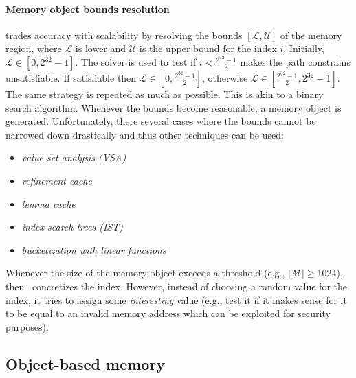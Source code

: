 \paragraph{Memory object bounds resolution} \cite{MAYHEM-SP12} trades accuracy with scalability by resolving the bounds $[\mathcal{L}, \mathcal{U}]$ of the memory region, where $\mathcal{L}$ is lower and $\mathcal{U}$ is the upper bound for the index $i$. Initially, $\mathcal{L} \in [0, 2^{32}-1]$. The solver is used to test if $i < \frac{2^{32}-1}{2}$ makes the path constrains unsatisfiable. If satisfiable then $\mathcal{L} \in [0, \frac{2^{32}-1}{2}]$, otherwise $\mathcal{L} \in [\frac{2^{32}-1}{2}, 2^{32}-1]$. The same strategy is repeated as much as possible. This is akin to a binary search algorithm. Whenever the bounds become reasonable, a memory object is generated. Unfortunately, there several cases where the bounds cannot be narrowed down drastically and thus other techniques can be used:
\begin{itemize}
  \item {\em value set analysis (VSA)}
  \item {\em refinement cache}
  \item {\em lemma cache}
  \item {\em index search trees (IST)}
  \item {\em bucketization with linear functions}
\end{itemize}
Whenever the size of the memory object exceeds a threshold (e.g., $|\mathcal{M}| \geq 1024$), then~\cite{MAYHEM-SP12} concretizes the index. However, instead of choosing a random value for the index, it tries to assign some {\em interesting} value (e.g., test it if it makes sense for it to be equal to an invalid memory address which can be exploited for security purposes).

\subsection{Object-based memory~\cite{EXE-CCS06,STP-TR07}}

